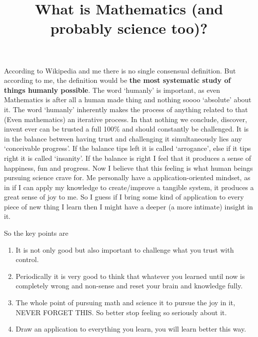 \documentclass[12pt]{article}
\title{What is Mathematics (and probably science too)?}
\author{}
\begin{document}
\maketitle

According to Wikipedia and me there is no single consensual definition.
But according to me, the definition would be \textbf{the most systematic study of things humanly possible}.
The word `humanly' is important, as even Mathematics is after all a human made thing and nothing soooo `absolute' about it.
The word `humanly' inherently makes the process of anything related to that (Even mathematics) an iterative process.
In that nothing we conclude, discover, invent ever can be trusted a full 100\% and should constantly be challenged.
It is in the balance between having trust and challenging it simultaneously lies any `conceivable progress'.
If the balance tips left it is called `arrogance', else if it tips right it is called  `insanity'.
If the balance is right I feel that it produces a sense of happiness, fun and progress.
Now I believe that this feeling is what human beings pursuing science crave for.
Me personally have a application-oriented mindset, as in if I can apply my knowledge to create/improve a tangible system, it produces a great sense of joy to me.
So I guess if I bring some kind of application to every piece of new thing I learn then I might have a deeper (a more intimate) insight in it.

So the key points are
\begin{enumerate}
  \item It is not only good but also important to challenge what you trust with control.
  \item Periodically it is very good to think that whatever you learned until now is completely wrong and non-sense and reset your brain and knowledge fully.
  \item The whole point of pursuing math and science it to pursue the joy in it, NEVER FORGET THIS. So better stop feeling so seriously about it.
  \item Draw an application to everything you learn, you will learn better this way.
\end{enumerate}
\end{document}
